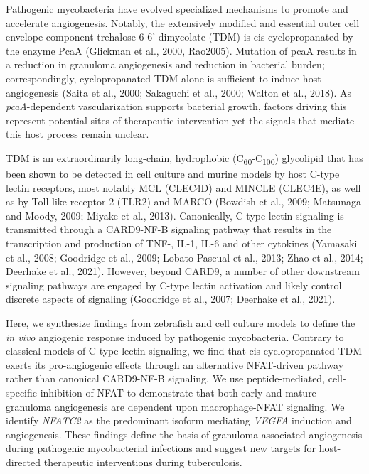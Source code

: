 Pathogenic mycobacteria have evolved specialized mechanisms to promote and accelerate angiogenesis. Notably, the extensively modified and essential outer cell envelope component trehalose 6-6'-dimycolate (TDM) is cis-cyclopropanated by the enzyme PcaA (Glickman et al., 2000, Rao2005). Mutation of pcaA results in a reduction in granuloma angiogenesis and reduction in bacterial burden; correspondingly, cyclopropanated TDM alone is sufficient to induce host angiogenesis (Saita et al., 2000; Sakaguchi et al., 2000; Walton et al., 2018). As \textit{pcaA}-dependent vascularization supports bacterial growth, factors driving this represent potential sites of therapeutic intervention yet the signals that mediate this host process remain unclear.

TDM is an extraordinarily long-chain, hydrophobic (C\textsubscript{60}-C\textsubscript{100}) glycolipid that has been shown to be detected in cell culture and murine models by host C-type lectin receptors, most notably MCL (CLEC4D) and MINCLE (CLEC4E), as well as by Toll-like receptor 2 (TLR2) and MARCO (Bowdish et al., 2009; Matsunaga and Moody, 2009; Miyake et al., 2013). Canonically, C-type lectin signaling is transmitted through a CARD9-NF-\textkappa B signaling pathway that results in the transcription and production of TNF-\textalpha, IL-1\textbeta, IL-6 and other cytokines (Yamasaki et al., 2008; Goodridge et al., 2009; Lobato-Pascual et al., 2013; Zhao et al., 2014; Deerhake et al., 2021). However, beyond CARD9, a number of other downstream signaling pathways are engaged by C-type lectin activation and likely control discrete aspects of signaling (Goodridge et al., 2007; Deerhake et al., 2021).

Here, we synthesize findings from zebrafish and cell culture models to define the \textit{in vivo} angiogenic response induced by pathogenic mycobacteria. Contrary to classical models of C-type lectin signaling, we find that cis-cyclopropanated TDM exerts its pro-angiogenic effects through an alternative NFAT-driven pathway rather than canonical CARD9-NF-\textkappa B signaling. We use peptide-mediated, cell-specific inhibition of NFAT to demonstrate that both early and mature granuloma angiogenesis are dependent upon macrophage-NFAT signaling. We identify \textit{NFATC2} as the predominant isoform mediating \textit{VEGFA} induction and angiogenesis. These findings define the basis of granuloma-associated angiogenesis during pathogenic mycobacterial infections and suggest new targets for host-directed therapeutic interventions during tuberculosis.

